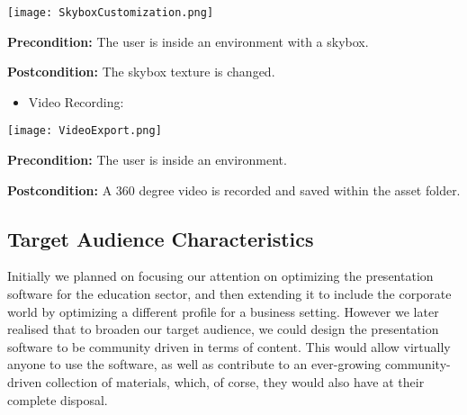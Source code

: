 \begin{flushleft}
	\begin{center}
	\texttt{[image: SkyboxCustomization.png]}
	\end{center}

	\textbf{Precondition:} The user is inside an environment with a skybox.

	\textbf{Postcondition:} The skybox texture is changed.

	\begin{itemize}
		\item Video Recording:
	\end{itemize}

	\begin{center}
	\texttt{[image: VideoExport.png]}
	\end{center}

	\textbf{Precondition:} The user is inside an environment.

	\textbf{Postcondition:} A 360 degree video is recorded and saved within the asset folder.
	\end{flushleft}

\subsection{Target Audience Characteristics}

	Initially we planned on focusing our attention on optimizing the presentation software for the education sector, and then extending it to include the corporate world by optimizing a different profile for a business setting.  However we later realised that to broaden our target audience, we could design the presentation software to be community driven in terms of content.  This would allow virtually anyone to use the software, as well as contribute to an ever-growing community-driven collection of materials, which, of corse, they would also have at their complete disposal.

